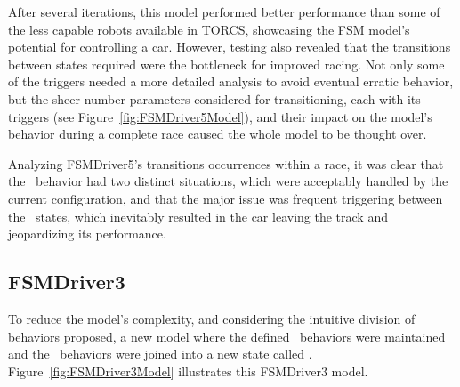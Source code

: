 After several iterations, this model performed better performance than some of the less capable robots available in TORCS, showcasing the FSM model's potential for controlling a car. However, testing also revealed that the transitions between states required were the bottleneck for improved racing. Not only some of the triggers needed a more detailed analysis to avoid eventual erratic behavior, but the sheer number parameters considered for transitioning, each with its triggers (see Figure~\ref{fig:FSMDriver5Model}), and their impact on the model's behavior during a complete race caused the whole model to be thought over.

Analyzing FSMDriver5's transitions occurrences within a race, it was clear that the \recovery~behavior had two distinct situations, which were acceptably handled by the current configuration, and that the major issue was frequent triggering between the \racing~states, which inevitably resulted in the car leaving the track and jeopardizing its performance.

\subsection{FSMDriver3}%
To reduce the model's complexity, and considering the intuitive division of behaviors proposed, a new model where the defined \recovery~behaviors were maintained and the \racing~behaviors were joined into a new state called \IT. Figure~\ref{fig:FSMDriver3Model} illustrates this FSMDriver3 model.

